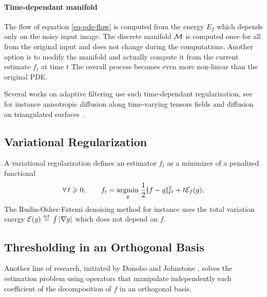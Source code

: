 \documentclass[final]{siamltex}
\newcommand{\F}{f}
\begin{document}
\paragraph{Time-dependant manifold}

The flow of equation \eqref{eq-pde-flow} is computed from the energy $E_{\F}$ which depends only on the noisy input image. The discrete manifold $\mathcal{M}$ is computed once for all from the original input and does not change during the computations. Another option is to modify the manifold and actually compute it from the current estimate $\F_t$ at time $t$
\eql{\label{eq-time-dtp-flow}
	\foralls t>0, \quad \pd{\F_t}{t}(x) = - \text{grad}_{\F_t} (\energy_{\F_t})
	\qqwithqq \F_0=\F.
}
The overall process becomes even more non-linear than the original PDE.

Several works on adaptive filtering use such time-dependant regularization, see for instance anisotropic diffusion along time-varying tensors fields \cite{tschumperle-inpainting} and diffusion on triangulated surfaces~\cite{desbrun-implicit-fairing}.

\subsection{Variational Regularization}
\label{subsect-variational-regularization}

A variational regularization defines an estimator $\F_t$ as a minimizer of a penalized functional
\begin{equation} %
	\label{eq-variational-regularization}
	\foralls t\geq 0, \qquad \F_t = \uargmin{g} \frac{1}{2} \norm{\F-g}_{\ldeux}^2 + t \energy_{\F}( g ),
\end{equation}
The Rudin-Osher-Fatemi denoising method \cite{rudin-tv} for instance uses the total variation energy $\mathcal{E}(g) \stackrel{\mbox{\upshape\tiny def.}}{=} \int | \nabla g |$ which does not depend on $\F$. 


\subsection{Thresholding in an Orthogonal Basis}
\label{subsect-thresholding-ortho-basis}

Another line of research, initiated by Donoho and Johnstone \cite{donoho-shrinkage}, solves the estimation problem using operators that manipulate independently each coefficient of the decomposition of $\F$ in an orthogonal basis. 
\end{document}
